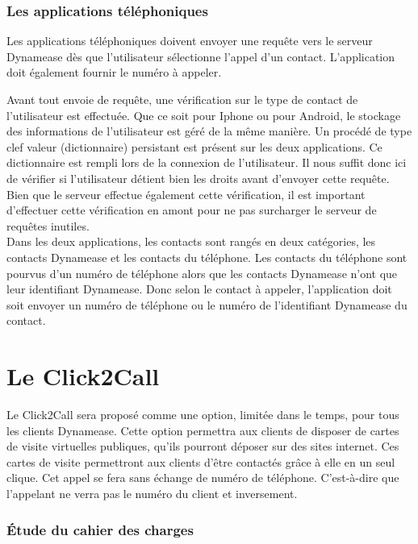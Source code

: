 \subsubsection{Les applications téléphoniques}

Les applications téléphoniques doivent envoyer une requête vers le serveur Dynamease dès que l'utilisateur sélectionne l'appel d'un contact. L'application doit également fournir le numéro à appeler.

Avant tout envoie de requête, une vérification sur le type de contact de l'utilisateur est effectuée. Que ce soit pour Iphone ou pour Android, le stockage des informations de l'utilisateur est géré de la même manière. Un procédé de type clef valeur (dictionnaire) persistant est présent sur les deux applications. Ce dictionnaire est rempli lors de la connexion de l'utilisateur. Il nous suffit donc ici de vérifier si l'utilisateur détient bien les droits avant d'envoyer cette requête. Bien que le serveur effectue également cette vérification, il est important d'effectuer cette vérification en amont pour ne pas surcharger le serveur de requêtes inutiles.\\

Dans les deux applications, les contacts sont rangés en deux catégories, les contacts Dynamease et les contacts du téléphone. Les contacts du téléphone sont pourvus d'un numéro de téléphone alors que les contacts Dynamease n'ont que leur identifiant Dynamease. Donc selon le contact à appeler, l'application doit soit envoyer un numéro de téléphone ou le numéro de l'identifiant Dynamease du contact.

\section{Le Click2Call}

Le Click2Call sera proposé comme une option, limitée dans le temps, pour tous les clients Dynamease. Cette option permettra aux clients de disposer de cartes de visite virtuelles publiques, qu'ils pourront déposer sur des sites internet. Ces cartes de visite permettront aux clients d'être contactés grâce à elle en un seul clique. Cet appel se fera sans échange de numéro de téléphone. C'est-à-dire que l'appelant ne verra pas le numéro du client et inversement.

\subsubsection{Étude du cahier des charges}


